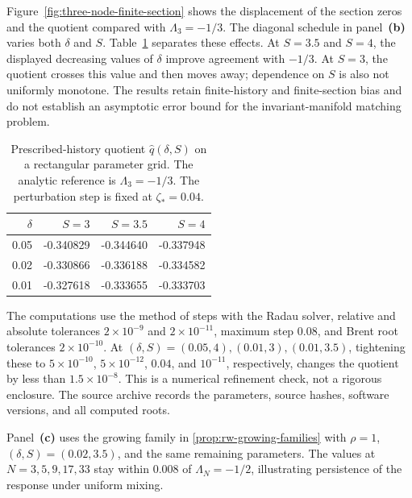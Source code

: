 Figure~\ref{fig:three-node-finite-section} shows the displacement of the
section zeros and the quotient compared with \(\Lambda_3=-1/3\).  The
diagonal schedule in panel~\textbf{(b)} varies both \(\delta\) and \(S\).
Table~\ref{tab:window-grid} separates these effects.  At \(S=3.5\) and
\(S=4\), the displayed decreasing values of \(\delta\) improve agreement
with \(-1/3\).  At \(S=3\), the quotient crosses this value and then moves
away; dependence on \(S\) is also not uniformly monotone.  The results retain
finite-history and finite-section bias and do not establish an asymptotic
error bound for the invariant-manifold matching problem.

\begin{table}[tb]
\centering
\caption{Prescribed-history quotient \(\widehat q(\delta,S)\) on a
rectangular parameter grid.  The analytic reference is \(\Lambda_3=-1/3\).
The perturbation step is fixed at \(\zeta_*=0.04\).}
\label{tab:window-grid}
\begin{tabular}{@{}rrrr@{}}
\toprule
\(\delta\) & \(S=3\) & \(S=3.5\) & \(S=4\)\\
\midrule
0.05 & -0.340829 & -0.344640 & -0.337948\\
0.02 & -0.330866 & -0.336188 & -0.334582\\
0.01 & -0.327618 & -0.333655 & -0.333703\\
\bottomrule
\end{tabular}
\end{table}

The computations use the method of steps with the Radau solver, relative and
absolute tolerances \(2\times10^{-9}\) and \(2\times10^{-11}\), maximum
step \(0.08\), and Brent root tolerances \(2\times10^{-10}\).
At \((\delta,S)=(0.05,4),(0.01,3),(0.01,3.5)\), tightening these to
\(5\times10^{-10}\), \(5\times10^{-12}\), \(0.04\), and
\(10^{-11}\), respectively, changes the quotient by less than
\(1.5\times10^{-8}\).  This is a numerical refinement check, not a rigorous
enclosure.  The source archive records the parameters, source hashes,
software versions, and all computed roots.

Panel~\textbf{(c)} uses the growing family in \cref{prop:rw-growing-families}
with \(\rho=1\), \((\delta,S)=(0.02,3.5)\), and the same remaining
parameters.  The values at \(N=3,5,9,17,33\) stay within \(0.008\) of
\(\Lambda_N=-1/2\), illustrating persistence of the response under uniform
mixing.



